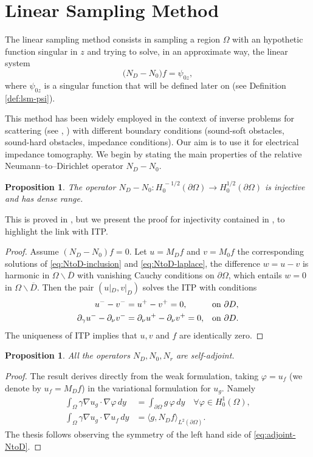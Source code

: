 \documentclass[10pt, a4paper, twoside, openright]{book}
\theoremstyle{definition}
\theoremstyle{plain}
\theoremstyle{plain}
\theoremstyle{plain}
\newtheorem{proposition}[subsection]{Proposition}
\theoremstyle{plain}
\theoremstyle{plain}
\theoremstyle{plain}
\theoremstyle{plain}
\theoremstyle{plain}
\let\phi\varphi
\begin{document}
\section{Linear Sampling Method}
 The linear sampling method consists in sampling a region $\Omega$ with an hypothetic function 
 singular in $z$ and trying to solve, in an approximate way, the linear system
 \begin{equation}
 \label{eq:lsm-approximate-lin-eq}
  \bigl({N_D} - {N_0}\bigr)f=\psi_{0z},
 \end{equation}
 where $\psi_{0z}$ is a singular function that will be defined later on (see Definition \ref{def:lsm-psi}).
 \par
 This method has been widely employed in the context of inverse problems for scattering (see \cite{colton-haddar-piana:lsm}, \cite{cakoni-colton-haddar:lsm}) with different boundary conditions (sound-soft obstacles, sound-hard obstacles, impedance conditions). Our aim is to use it for electrical impedance tomography.
 We begin by stating the main properties of the relative Neumann--to--Dirichlet operator ${N_D} - {N_0}$.
 \begin{proposition}
  The operator ${N_D} - {N_0}:H_0^{\,-1/2}(\partial \Omega)\to H_0^{1/2}(\partial \Omega)$ is injective and has dense range.
 \end{proposition}
 This is proved in \cite{kirsch:book}, but we present the proof for injectivity contained in \cite{somersalo:preprint}, to highlight the link with ITP.
 \begin{proof}
 Assume $({N_D} - {N_0})f = 0$. Let $u=M_Df$ and $v=M_0f$ the corresponding solutions of \eqref{eq:NtoD-inclusion} and \eqref{eq:NtoD-laplace},
 the difference $w=u-v$ is harmonic in $\Omega\backslash\overline{D}$ with vanishing Cauchy conditions on $\partial \Omega$, which entails $w=0$ in $\Omega\backslash\overline{D}$. Then the pair $(u|_D,v|_D)$ solves the ITP with conditions
 \begin{align}
  u^--v^- &=u^+ - v^+ = 0 ,&& \textup{on }\partial D,\\
  \partial_\gamma u^- - \partial_\nu v^- &= \partial_\nu u^+ - \partial_\nu v^+ = 0 ,&& \textup{on }\partial D.
 \end{align}
The uniqueness of ITP implies that $u,v$ and $f$ are identically zero. 
 \end{proof}
\begin{proposition}
  All the operators ${N_D}, {N_0}, {N_r}$ are self-adjoint.
 \end{proposition}
 \begin{proof}
 The result derives directly from the weak formulation, taking $\phi=u_f$ (we denote by $u_f=M_Df$) in the variational formulation for $u_g$. Namely
 \begin{align}
  \int_{\Omega}\gamma\nabla u_g \cdot \nabla \phi\,dy &= \int_{\partial\Omega}g\,\phi\,dy \quad \forall \phi\in H^1_0(\Omega) ,\\
  \int_{\Omega}\gamma\nabla u_g \cdot \nabla u_f\,dy &= \langle g, {N_D} f\rangle_{L^2(\partial \Omega)} \label{eq:adjoint-NtoD}.
 \end{align}
The thesis follows observing the symmetry of the left hand side of \eqref{eq:adjoint-NtoD}.
 \end{proof}
\end{document}
